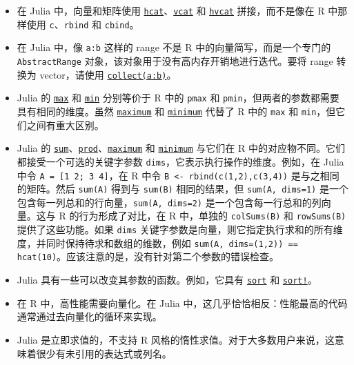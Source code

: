 \begin{itemize}
\item 在 Julia 中，向量和矩阵使用 \hyperlink{8862791894748483563}{\texttt{hcat}}、\hyperlink{14691815416955507876}{\texttt{vcat}} 和 \hyperlink{16279083053557795116}{\texttt{hvcat}} 拼接，而不是像在 R 中那样使用 \texttt{c}、\texttt{rbind} 和 \texttt{cbind}。


\item 在 Julia 中，像 \texttt{a:b} 这样的 range 不是 R 中的向量简写，而是一个专门的 \texttt{AbstractRange} 对象，该对象用于没有高内存开销地进行迭代。要将 range 转换为 vector，请使用 \hyperlink{6278865767444641812}{\texttt{collect(a:b)}}。


\item Julia 的 \hyperlink{7839419811914289844}{\texttt{max}} 和 \hyperlink{7458766354532817148}{\texttt{min}} 分别等价于 R 中的 \texttt{pmax} 和 \texttt{pmin}，但两者的参数都需要具有相同的维度。虽然 \hyperlink{14719513931696680717}{\texttt{maximum}} 和 \hyperlink{13126064576294034099}{\texttt{minimum}} 代替了 R 中的 \texttt{max} 和 \texttt{min}，但它们之间有重大区别。


\item Julia 的 \hyperlink{8666686648688281595}{\texttt{sum}}、\hyperlink{13484084847910116333}{\texttt{prod}}、\hyperlink{14719513931696680717}{\texttt{maximum}} 和 \hyperlink{13126064576294034099}{\texttt{minimum}} 与它们在 R 中的对应物不同。它们都接受一个可选的关键字参数 \texttt{dims}，它表示执行操作的维度。例如，在 Julia 中令 \texttt{A = [1 2; 3 4]}，在 R 中令 \texttt{B <- rbind(c(1,2),c(3,4))} 是与之相同的矩阵。然后 \texttt{sum(A)} 得到与 \texttt{sum(B)} 相同的结果，但 \texttt{sum(A, dims=1)} 是一个包含每一列总和的行向量，\texttt{sum(A, dims=2)} 是一个包含每一行总和的列向量。这与 R 的行为形成了对比，在 R 中，单独的 \texttt{colSums(B)} 和 \texttt{rowSums(B)} 提供了这些功能。如果 \texttt{dims} 关键字参数是向量，则它指定执行求和的所有维度，并同时保持待求和数组的维数，例如 \texttt{sum(A, dims=(1,2)) == hcat(10)}。应该注意的是，没有针对第二个参数的错误检查。


\item Julia 具有一些可以改变其参数的函数。例如，它具有 \hyperlink{8473525809131227606}{\texttt{sort}} 和 \hyperlink{12296873681374954808}{\texttt{sort!}}。


\item 在 R 中，高性能需要向量化。在 Julia 中，这几乎恰恰相反：性能最高的代码通常通过去向量化的循环来实现。


\item Julia 是立即求值的，不支持 R 风格的惰性求值。对于大多数用户来说，这意味着很少有未引用的表达式或列名。



\end{itemize}
